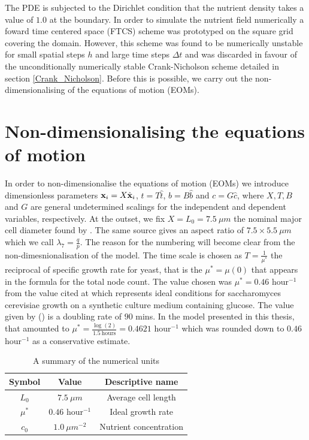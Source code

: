 The PDE is subjected to the Dirichlet condition
that the nutrient density takes a value of $1.0$ at the boundary. In order to simulate the nutrient field
numerically a foward time centered space (FTCS) scheme was prototyped on the square grid 
covering the domain. However, this scheme was found to be numerically unstable
for small spatial steps $h$ and large time steps $\Delta t$ and was discarded
in favour of the unconditionally numerically stable Crank-Nicholson scheme detailed
in section \ref{Crank_Nicholson}. Before this is possible, 
we carry out the non-dimensionalising of the equations of motion (EOMs).


\section{Non-dimensionalising the equations of motion}
In order to non-dimensionalise the equations of motion (EOMs) we
introduce dimensionless parameters $\vb{x}_i = X\hat{\vb{x}}_i$, $t = T \hat{t}$, $b = B \hat{b}$
and $c = G \hat{c}$, where $X, T, B$ and $G$ are general undetermined scalings for the independent 
and dependent variables, respectively. At the outset, we fix $X = L_0 = 7.5 \ \mu m$ the nominal major cell diameter
found by \cite{chavez2024cell}. The same source gives an aspect ratio
of $7.5 \times 5.5 \ \mu m$ which we call $\lambda_7 = \frac{q}{p}$. The reason for the numbering 
will become clear from the non-dimesnionalisation of the model. The time scale is chosen as
$T = \frac{1}{\mu^*}$ the reciprocal of specific growth rate for yeast, that is the $\mu^* = \mu(0)$ that appears in
the formula for the total node count. The value chosen was $\mu^* = 0.46$ hour$^{-1}$
from the value cited at \cite{salari2017investigation} which represents ideal conditions
for saccharomyces cerevisiae growth on a synthetic culture medium containing glucose. 
The value given by (\cite{salari2017investigation}) is a doubling rate of $90$ mins. In the model
presented in this thesis, that amounted to $\mu^* = \frac{\log(2)}{1.5 \ \textrm{hours}} = 0.4621$ hour$^{-1}$ which
was rounded down to $0.46$ hour$^{-1}$ as a conservative estimate.

\begin{table}[!htb]
\begin{center}
    \begin{tabular}{ |c|c|c| } 
     \hline
      \textbf{Symbol} & \textbf{Value} & \textbf{Descriptive name} \\ 
      \hline
     $L_0$   & $7.5 \ \mu m$       & Average cell length \\ 
     $\mu^*$ & $0.46$ hour$^{-1}$   & Ideal growth rate  \\ 
     $c_0$   & $1.0 \ \mu m^{-2}$  & Nutrient concentration \\ 
     \hline
     
    \end{tabular}
    
\end{center}
\caption{A summary of the numerical units}
\label{table:NumericalUnits}
\end{table}

